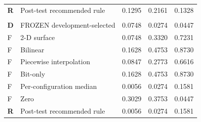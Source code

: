 \begin{table}[H]
\begin{tabular}{@{}llrrr@{}}
\textbf{R} & Post-test recommended rule & 0.1295 & 0.2161 & 0.1328 \\
\addlinespace
\multicolumn{5}{@{}l}{\textit{New state, $g=128$; $n=3$}} \\
\textbf{D} & FROZEN development-selected & 0.0748 & 0.0274 & 0.0447 \\
F & 2-D surface & 0.0748 & 0.3320 & 0.7231 \\
F & Bilinear & 0.1628 & 0.4753 & 0.8730 \\
F & Piecewise interpolation & 0.0847 & 0.2773 & 0.6616 \\
F & Bit-only & 0.1628 & 0.4753 & 0.8730 \\
F & Per-configuration median & 0.0056 & 0.0274 & 0.1581 \\
F & Zero & 0.3029 & 0.3753 & 0.0447 \\
\textbf{R} & Post-test recommended rule & 0.0056 & 0.0274 & 0.1581 \\
\bottomrule
\end{tabular}
\end{table}
